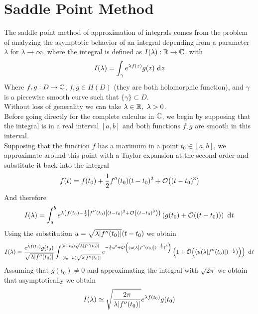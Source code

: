 \documentclass[../qm.tex]{subfiles}
\begin{document}
	\section{Saddle Point Method}
	The saddle point method of approximation of integrals comes from the problem of analyzing the asymptotic behavior of an integral depending from a parameter $\lambda$ for $\lambda\to\infty$, where the integral is defined as $I(\lambda):\mathbb{R}\to\mathbb{C}$, with
	\begin{equation}
		I(\lambda)=\int_{\gamma}e^{\lambda f(z)}g(z)\ \mathrm{d}^{}z
		\label{eq:saddlepointintegral}
	\end{equation}
	Where $f,g:D\to\mathbb{C}$, $f,g\in H(D)$ (they are both holomorphic function), and $\gamma$ is a piecewise smooth curve such that $\{\gamma\}\subset D$.\\
	Without loss of generality we can take $\lambda\in\mathbb{R},\ \lambda>0$.\\
	Before going directly for the complete calculus in $\mathbb{C}$, we begin by supposing that the integral is in a real interval $[a,b]$ and both functions $f,g$ are smooth in this interval.\\
	Supposing that the function $f$ has a maximum in a point $t_0\in[a,b]$, we approximate around this point with a Taylor expansion at the second order and substitute it back into the integral
	\begin{equation*}
		f(t)=f(t_0)+\frac{1}{2}f''(t_0)(t-t_0)^2+\order{(t-t_0)^3}
	\end{equation*}
	And therefore
	\begin{equation}
		I(\lambda)=\int_{a}^{b}e^{\lambda\left( f(t_0)-\frac{1}{2}\abs{f''(t_0)}(t-t_0)^2+\order{(t-t_0)^3} \right)}\left( g(t_0)+\order{(t-t_0)} \right)\diff{t}
		\label{eq:Ilambdareal2ord}
	\end{equation}
	Using the substitution $u=\sqrt{\lambda\abs{f''(t_0)}}(t-t_0)$ we obtain
	\begin{equation}
		I(\lambda)=\frac{e^{\lambda f(t_0)}g(t_0)}{\sqrt{\lambda\abs{f''(t_0)}}}\int_{-(t_0-a)\sqrt{\lambda\abs{f''(t_0)}}}^{(b-t_0)\sqrt{\lambda\abs{f''(t_0)}}}e^{-\frac{1}{2}u^2+\order{(u(\lambda\abs{f''(t_0)})^{-\frac{1}{2}})^3}}\left( 1+\order{(u(\lambda\abs{f''(t_0)})^{-\frac{1}{2}})} \right)\diff{t}
		\label{eq:integralapproximated}
	\end{equation}
	Assuming that $g(t_0)\ne0$ and approximating the integral with $\sqrt{2\pi}$ we obtain that asymptotically we obtain
	\begin{equation}
		I(\lambda)\simeq\sqrt{\frac{2\pi}{\lambda\abs{f''(t_0)}}}e^{\lambda f(t_0)}g(t_0)
		\label{eq:Ilambdaapproximatedreal}
	\end{equation}
\end{document}

